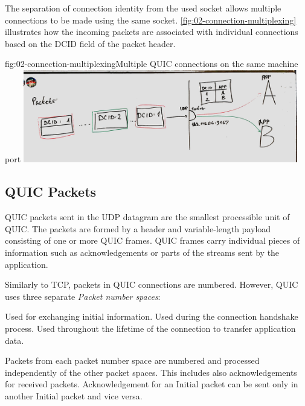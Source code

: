 The separation of connection identity from the used socket allows multiple connections to be made
using the same socket. \autoref{fig:02-connection-multiplexing} illustrates how the incoming
packets are associated with individual connections based on the DCID field of the packet header.

\begin{myFigure}{fig:02-connection-multiplexing}{Multiple QUIC connections on the same machine port}
  \includegraphics[width=0.9\textwidth]{img/02-socket-multiplexing}
\end{myFigure}


\subsection{QUIC Packets}

QUIC packets sent in the UDP datagram are the smallest processible unit of QUIC\@. The packets are
formed by a header and variable-length payload consisting of one or more QUIC frames. QUIC frames
carry individual pieces of information such as acknowledgements or parts of the streams sent by
the application.

Similarly to TCP, packets in QUIC connections are numbered. However, QUIC uses three separate
\textit{Packet number spaces}:

\begin{enumerate}
   Used for exchanging initial information.
   Used during the connection handshake process.
   Used throughout the lifetime of the connection to transfer application data.
\end{enumerate}

Packets from each packet number space are numbered and processed independently of the other packet
spaces. This includes also acknowledgements for received packets. Acknowledgement for an Initial packet can be sent only in another Initial packet and vice versa.

